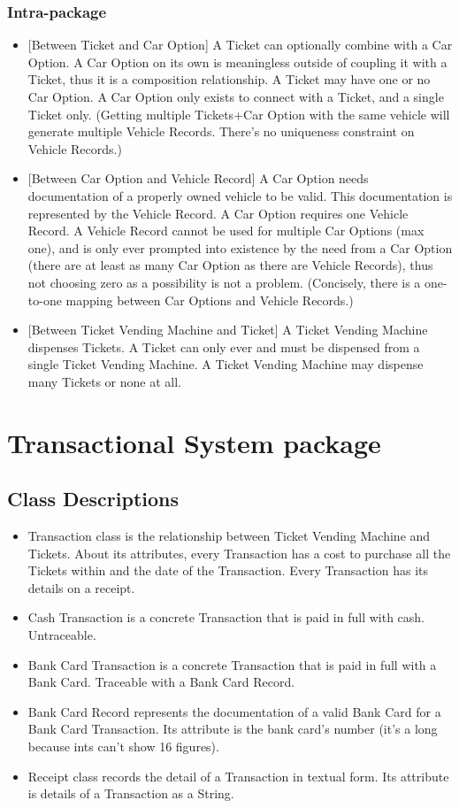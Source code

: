 \documentclass[letterpaper]{report}
\begin{document}
\subsubsection{Intra-package}
\begin{itemize}
    \item {[Between Ticket and Car Option]} A Ticket can optionally combine with a Car Option. A Car Option on its own is meaningless outside of coupling it with a Ticket, thus it is a composition relationship. A Ticket may have one or no Car Option. A Car Option only exists to connect with a Ticket, and a single Ticket only. (Getting multiple Tickets+Car Option with the same vehicle will generate multiple Vehicle Records. There’s no uniqueness constraint on Vehicle Records.)
    \item {[Between Car Option and Vehicle Record]} A Car Option needs documentation of a properly owned vehicle to be valid. This documentation is represented by the Vehicle Record. A Car Option requires one Vehicle Record. A Vehicle Record cannot be used for multiple Car Options (max one), and is only ever prompted into existence by the need from a Car Option (there are at least as many Car Option as there are Vehicle Records), thus not choosing zero as a possibility is not a problem. (Concisely, there is a one-to-one mapping between Car Options and Vehicle Records.)
    \item {[Between Ticket Vending Machine and Ticket]} A Ticket Vending Machine dispenses Tickets. A Ticket can only ever and must be dispensed from a single Ticket Vending Machine. A Ticket Vending Machine may dispense many Tickets or none at all.
\end{itemize}

\section{Transactional System package}
\subsection{Class Descriptions}
\begin{itemize}
    \item Transaction class is the relationship between Ticket Vending Machine and Tickets. About its attributes, every Transaction has a cost to purchase all the Tickets within and the date of the Transaction. Every Transaction has its details on  a receipt.
    \item Cash Transaction is a concrete Transaction that is paid in full with cash. Untraceable.
    \item Bank Card Transaction is a concrete Transaction that is paid in full with a Bank Card. Traceable with a Bank Card Record.
    \item Bank Card Record represents the documentation of a valid Bank Card for a Bank Card Transaction. Its attribute is the bank card’s number (it’s a long because ints can’t show 16 figures).
    \item Receipt class records the detail of a Transaction in textual form. Its attribute is details of a Transaction as a String.
\end{itemize}
\end{document}
